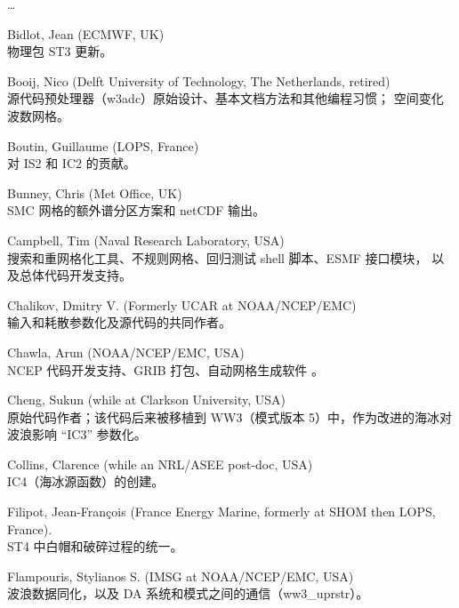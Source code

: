 \begin{list}{\ldots}{ }
\item [Bidlot, Jean] (ECMWF, UK) \\
  物理包 ST3 更新。

\item [Booij, Nico] (Delft University of Technology, The Netherlands, retired) \\
  源代码预处理器（{\code w3adc}）原始设计、基本文档方法和其他编程习惯；
  空间变化波数网格。

\item [Boutin, Guillaume] (LOPS, France) \\
  对 IS2 和 IC2 的贡献。

\item [Bunney, Chris] (Met Office, UK) \\
  SMC 网格的额外谱分区方案和 netCDF 输出。

\item [Campbell, Tim] (Naval Research Laboratory, USA)\\
  搜索和重网格化工具、不规则网格、回归测试 shell 脚本、ESMF 接口模块，
  以及总体代码开发支持。

\item [Chalikov, Dmitry V.] (Formerly UCAR at NOAA/NCEP/EMC) \\
  \cite{tol:JPO96} 输入和耗散参数化及源代码的共同作者。

\item [Chawla, Arun](NOAA/NCEP/EMC, USA) \\
  NCEP 代码开发支持、GRIB 打包、自动网格生成软件 \citep{tol:MMAB07a, tol:OMOD08a}。

\item [Cheng, Sukun] (while at Clarkson University, USA) \\
  原始代码作者；该代码后来被移植到 WW3（模式版本 5）中，作为改进的海冰对波浪影响
  ``IC3'' 参数化。

\item [Collins, Clarence] (while an NRL/ASEE post-doc, USA) \\
  IC4（海冰源函数）的创建。

\item [Filipot, Jean-Fran{\c c}ois] (France Energy Marine, formerly at SHOM then LOPS, France).\\
  ST4 中白帽和破碎过程的统一。

\item [Flampouris, Stylianos S.] (IMSG at NOAA/NCEP/EMC, USA) \\
  波浪数据同化，以及 DA 系统和模式之间的通信（ww3\_uprstr）。


\end{list}
